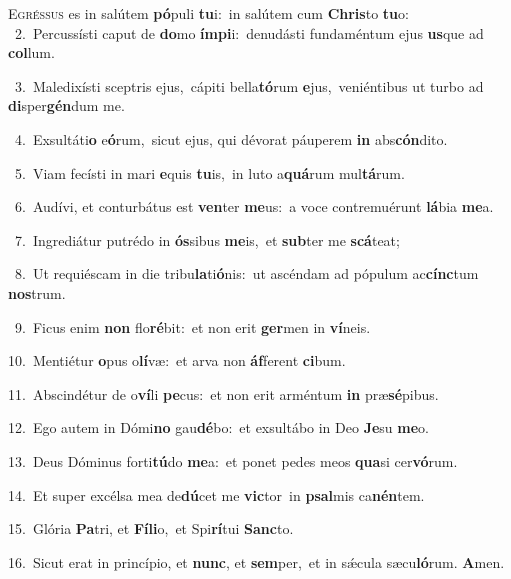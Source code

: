 \lettrine{\initial\textcolor{\initialcolor}{E}}{gréssus} es in salútem \textbf{pó}\-puli \textbf{tu}\-i:~\star in salútem cum \textbf{Chris}\-to \textbf{tu}\-o:\\
{\numbfont\textcolor{\numbcolor}{~2.}}~Percussísti caput de \textbf{do}\-mo \textbf{ím}\-\textbf{pi}i:~\star denudásti fundaméntum ejus \textbf{us}\-que ad \textbf{col}\-lum.\par
{\numbfont\textcolor{\numbcolor}{~3.}}~Maledixísti sceptris ejus,~\dagger cápiti bella\-\textbf{tó}\-rum \textbf{e}\-jus,~\star veniéntibus ut turbo ad \textbf{di}\-sper\-\textbf{gén}\-dum me.\par
{\numbfont\textcolor{\numbcolor}{~4.}}~Exsultáti\textbf{o} e\-\textbf{ó}\-rum,~\star sicut ejus, qui dévorat páuperem \textbf{in} abs\-\textbf{cón}\-dito.\par
{\numbfont\textcolor{\numbcolor}{~5.}}~Viam fecísti in mari \textbf{e}\-quis \textbf{tu}\-is,~\star in luto a\-\textbf{quá}\-rum mul\-\textbf{tá}\-rum.\par
{\numbfont\textcolor{\numbcolor}{~6.}}~Audívi, et conturbátus est \textbf{ven}\-ter \textbf{me}\-us:~\star a voce contremuérunt \textbf{lá}\-bia \textbf{me}\-a.\par
{\numbfont\textcolor{\numbcolor}{~7.}}~Ingrediátur putrédo in \textbf{ós}\-sibus \textbf{me}\-is,~\star et \textbf{sub}\-ter me \textbf{scá}\-teat;\par
{\numbfont\textcolor{\numbcolor}{~8.}}~Ut requiéscam in die tribu\-\textbf{la}\-ti\-\textbf{ó}\-nis:~\star ut ascéndam ad pópulum ac\-\textbf{cínc}\-tum \textbf{nos}\-trum.\par
{\numbfont\textcolor{\numbcolor}{~9.}}~Ficus enim \textbf{non} flo\-\textbf{ré}\-bit:~\star et non erit \textbf{ger}\-men in \textbf{ví}\-neis.\par
{\numbfont\textcolor{\numbcolor}{10.}}~Mentiétur \textbf{o}\-pus o\-\textbf{lí}\-væ:~\star et arva non \textbf{áf}\-ferent \textbf{ci}\-bum.\par
{\numbfont\textcolor{\numbcolor}{11.}}~Abscindétur de o\-\textbf{ví}\-li \textbf{pe}\-cus:~\star et non erit arméntum \textbf{in} præ\-\textbf{sé}\-pibus.\par
{\numbfont\textcolor{\numbcolor}{12.}}~Ego autem in Dómi\textbf{no} gau\-\textbf{dé}\-bo:~\star et exsultábo in Deo \textbf{Je}\-su \textbf{me}\-o.\par
{\numbfont\textcolor{\numbcolor}{13.}}~Deus Dóminus forti\-\textbf{tú}\-do \textbf{me}\-a:~\star et ponet pedes meos \textbf{qua}\-si cer\-\textbf{vó}\-rum.\par
{\numbfont\textcolor{\numbcolor}{14.}}~Et super excélsa mea de\-\textbf{dú}\-cet me \textbf{vic}\-tor~\star in \textbf{psal}\-mis ca\-\textbf{nén}\-tem.\par
{\numbfont\textcolor{\numbcolor}{15.}}~Glória \textbf{Pa}\-tri, et \textbf{Fí}\-\textbf{li}o,~\star et Spi\-\textbf{rí}\-tui \textbf{Sanc}\-to.\par
{\numbfont\textcolor{\numbcolor}{16.}}~Sicut erat in princípio, et \textbf{nunc}\-, et \textbf{sem}\-per,~\star et in sǽcula sæcu\-\textbf{ló}\-rum. \textbf{A}\-men.\par
